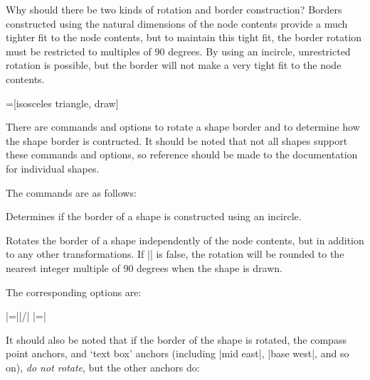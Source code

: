 	Why should there be two kinds of rotation and border construction?
	Borders constructed using the natural dimensions of the node contents
	provide a much tighter fit to the node contents, but to maintain 
	this tight fit, the border rotation must be restricted to multiples 
	of 90 degrees. By using an incircle, unrestricted rotation is 
	possible, but the border will not make a very tight fit to the node 
	contents.
	
\begin{codeexample}[]
=[isosceles triangle, draw]
\end{codeexample}

	There are \pgfname{} commands and \tikzname{} options to rotate a shape
	border and to determine how the shape border is contructed. It should
	be noted that not all shapes support these commands and options, so 
	reference should be made to the documentation for individual 
	shapes. 
	
	The \pgfname{} commands are as follows:

{\let\ifpgfshapeborderusesincircle\relax%
\begin{command}{\ifpgfshapeborderusesincircle}
   Determines if the border of a shape is constructed using an 
   incircle. 
\end{command}
}

\begin{command}{\pgfsetshapeborderrotate}
   Rotates the border of a shape independently of the node contents,
   but in addition to any other transformations. If 
   |\ifpgfshapeborderusesincircle| is false, the rotation will be
   rounded to the nearest integer multiple of 90 degrees when the
   shape is drawn. 
\end{command}

	The corresponding \tikzname{} options are:
	
\begin{itemize}

	|=||/|
	|=|
	
\end{itemize}

	It should also be noted that if the border of the shape is rotated, 
	the compass point anchors, and `text box' anchors (including 
	|mid east|, |base west|, and so on), \emph{do not rotate}, but the 
	other anchors do:
	
